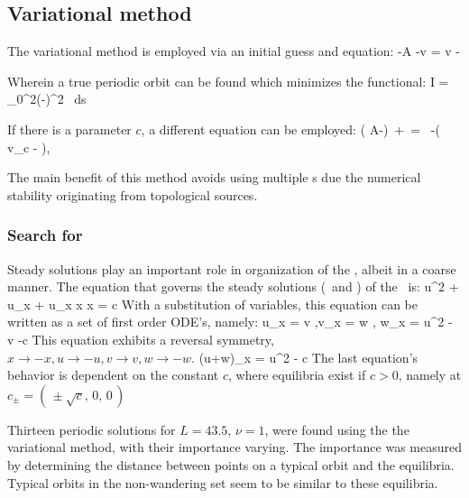 \subsection{Variational method}
\label{sect:MNGvarMeth}

The variational method is employed via an initial guess and equation:
\beq
{}
-\lambda A 
-v\frac{\partial \lambda}{\partial \tau} = \lambda v - 
\eeq

Wherein a true periodic orbit can be found which minimizes the functional:
\beq
I = \int_{0}^{2\pi}\left(-\lambda {}\right)^2 \, ds
\eeq

If there is a parameter $c$, a different equation can be employed:
\beq
\left( A-\lambda {}\right)\,
+\, =
\, -\left(\,v_c - \lambda {}\right),
\eeq

The main benefit of this method avoids using multiple \PoincSec s due the numerical stability originating from topological sources.

\subsubsection{Search for \eqva}
\label{sect:MNGsearchEqva}


Steady solutions play an important role in organization of the \statesp,
albeit in a coarse manner. The equation that governs the steady solutions
(\eqva\ and \reqva) of the \KSe\ is:
\beq
\nonumber
{}u^2 + u_x + u_{x x x} = c
\eeq
With a substitution of variables, this equation can be written as a set
of first order ODE's, namely:
\beq
\nonumber
u_x = v ,\quad v_x = w , \quad w_x = u^2 - v -c
\eeq
This equation exhibits a reversal symmetry, $x \rightarrow -x , u
\rightarrow -u , v \rightarrow v , w \rightarrow -w$.
\beq
\nonumber
(u+w)_x = u^2 - c
\eeq
The last equation's behavior is dependent on the constant $c$, where
equilibria exist if $c>0$, namely at $c_\pm = (\, \pm \sqrt{c}, \, 0, \,
0 \,)$

Thirteen periodic solutions for $L=43.5$, $\nu=1$, were found using the the variational method, with their importance varying. The importance was measured by determining the distance between points on a typical orbit and the equilibria. Typical orbits in the non-wandering set seem to
be similar to these equilibria.


